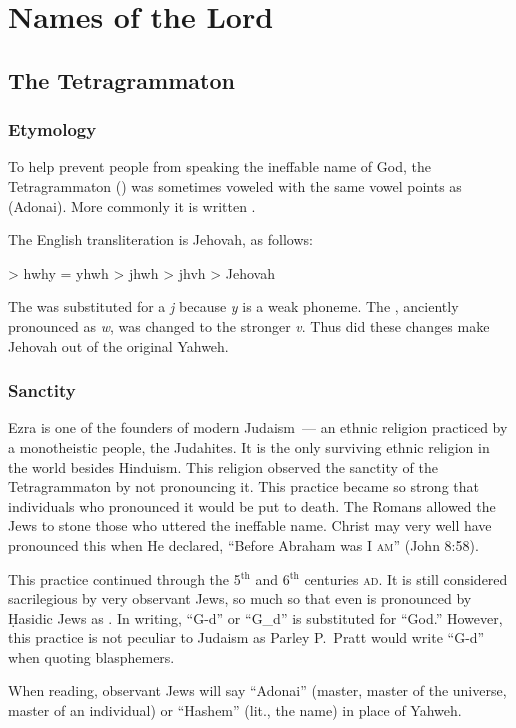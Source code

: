 \chapter{Names of the Lord}\label{app:names-of-the-lord}
\section{The Tetragrammaton}
\subsection{Etymology}
To help prevent people from speaking the ineffable name of God, the Tetragrammaton () was sometimes voweled with the same vowel points as  (Adonai). More commonly it is written .

The English transliteration is Jehovah, as follows:
\begin{center}
     > hwhy = yhwh > jhwh > jhvh > Jehovah
\end{center}
The  was substituted for a \emph{j} because \emph{y} is a weak phoneme. The , anciently pronounced as \emph{w}, was changed to the stronger \emph{v}. Thus did these changes make Jehovah out of the original Yahweh.

\subsection{Sanctity}
Ezra is one of the founders of modern Judaism~--- an ethnic religion practiced by a monotheistic people, the Judahites. It is the only surviving ethnic religion in the world besides Hinduism. This religion observed the sanctity of the Tetragrammaton by not pronouncing it. This practice became so strong that individuals who pronounced it would be put to death. The Romans allowed the Jews to stone those who uttered the ineffable name. Christ may very well have pronounced this when He declared, ``Before Abraham was \textsc{I am}'' (John 8:58).

This practice continued through the 5$^\text{th}$ and 6$^\text{th}$ centuries \textsc{ad}. It is still considered sacrilegious by very observant Jews, so much so that even  is pronounced by \d{H}asidic Jews as . In writing, ``G-d'' or ``G\_{}d'' is substituted for ``God.'' However, this practice is not peculiar to Judaism as Parley P.\ Pratt would write ``G-d'' when quoting blasphemers.

When reading, observant Jews will say ``Adonai'' (master, master of the universe, master of an individual) or ``Hashem'' (lit., the name) in place of Yahweh.

